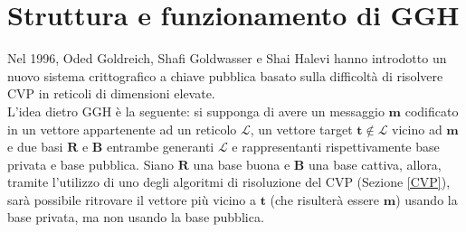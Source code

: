 \section{Struttura e funzionamento di GGH}
\label{sec:gghintroduction}
Nel 1996, Oded Goldreich, Shafi Goldwasser e Shai Halevi\cite{GGH97} hanno introdotto un nuovo 
sistema crittografico a chiave pubblica basato sulla difficoltà di risolvere CVP in reticoli
di dimensioni elevate. 
\\
L'idea dietro GGH è la seguente: si supponga di avere un messaggio $\mathbf{m}$ 
codificato in un vettore appartenente ad un reticolo $\mathcal{L}$, un vettore target 
$\mathbf{t} \notin \mathcal{L}$ vicino ad $\mathbf{m}$ e
due basi $\mathbf{R}$ e $\mathbf{B}$ entrambe generanti $\mathcal{L}$
e rappresentanti rispettivamente base privata e base pubblica. 
Siano $\mathbf{R}$ una base buona e $\mathbf{B}$ una base cattiva, allora, tramite l'utilizzo
di uno degli algoritmi di risoluzione del CVP (Sezione \ref{CVP}), sarà possibile ritrovare
il vettore più vicino a $\mathbf{t}$ (che risulterà essere $\mathbf{m}$) usando la base privata,
ma non usando la base pubblica.

